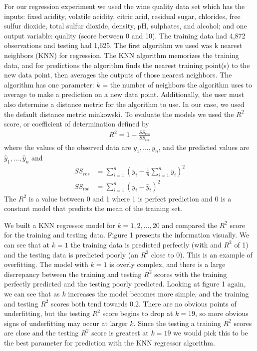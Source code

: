 \documentclass[12pt,letterpaper]{article}
\begin{document}
For our regression experiment we used the wine quality data set which has the inputs: fixed acidity, volatile acidity, citric acid, residual sugar, chlorides, free sulfur dioxide, total sulfur dioxide, density, pH, sulphates, and alcohol;
and one output variable: quality (score between 0 and 10). The training data had 4,872 observations and testing had 1,625. The first algorithm we used was k nearest neighbors (KNN) for regression. The KNN algorithm memorizes the training data, and for predictions the algorithm finds the nearest training point(s) to the new data point, then averages the outputs of those nearest neighbors. The algorithm has one parameter: $k$ = the number of neighbors the algorithm uses to average to make a prediction on a new data point. Additionally, the user must also determine a distance metric for the algorithm to use. In our case, we used the default distance metric minkowski. To evaluate the models we used the $R^2$ score, or coefficient of determination defined by
\begin{align}
	R^2=1-\frac{SS_{res}}{SS_{tot}}
\end{align} 
where the values of the observed data are $ y_1, ..., y_n $, and the predicted values are $ \hat{y}_1, ..., \hat{y}_n $ and
\begin{align*}
	SS_{res}&=\sum_{i=1}^{n}\left(y_i-\frac{1}{n}\sum_{i=1}^{n} y_i\right)^2\\
	SS_{tot}&=\sum_{i=1}^{n}\left(y_i-\hat{y}_i \right)^2
\end{align*}
The $ R^2 $ is a value between 0 and 1 where 1 is perfect prediction and 0 is a constant model that predicts the mean of the training set.

We built a KNN regressor model for $k=1,2,...,20$ and compared the $R^2$ score for the training and testing data. Figure 1 presents the information visually. We can see that at $k=1$ the training data is predicted perfectly (with and $R^2$ of 1) and the testing data is predicted poorly (an $R^2$ close to 0). This is an example of overfitting. The model with $k=1$ is overly complex, and there is a large discrepancy between the training and testing $R^2$ scores with the training perfectly predicted and the testing poorly predicted. Looking at figure 1 again, we can see that as $k$ increases the model becomes more simple, and the training and testing $R^2$ scores both tend towards 0.2. There are no obvious points of underfitting, but the testing $R^2$ score begins to drop at $k=19$, so more obvious signs of underfitting may occur at larger $k$. Since the testing a training $R^2$ scores are close and the testing $R^2$ score is greatest at $k=19$ we would pick this to be the best parameter for prediction with the KNN regressor algorithm.
\end{document}
